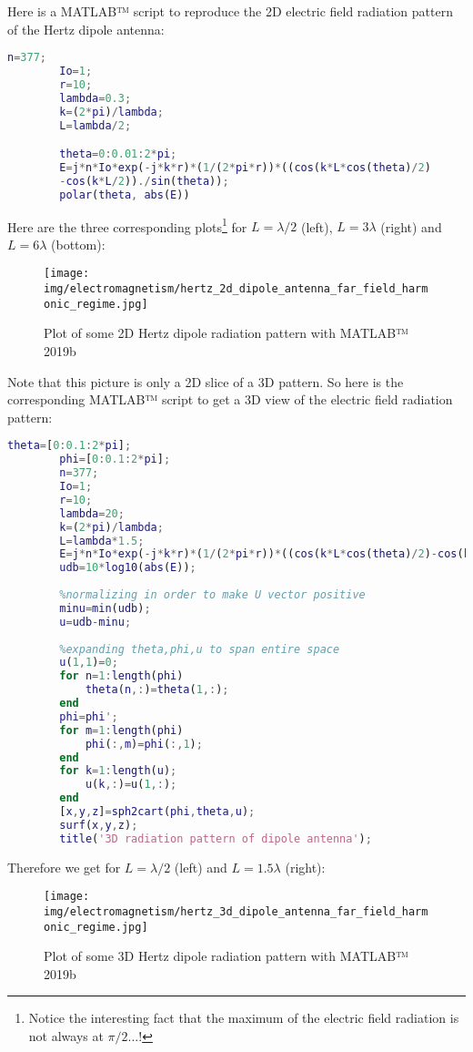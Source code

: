	Here is a MATLAB™ script to reproduce the 2D electric field radiation pattern of the Hertz dipole antenna:
	\begin{lstlisting}[language=MATLAB, caption={MATLAB code for 2D Hertz dipole antenna}]
		n=377;
		Io=1;
		r=10;
		lambda=0.3;
		k=(2*pi)/lambda;
		L=lambda/2;

		theta=0:0.01:2*pi;
		E=j*n*Io*exp(-j*k*r)*(1/(2*pi*r))*((cos(k*L*cos(theta)/2)
		-cos(k*L/2))./sin(theta));
		polar(theta, abs(E))
	\end{lstlisting}
	Here are the three corresponding plots\footnote{Notice the interesting fact that the maximum of the electric field radiation is not always at $\pi/2$...!} for $L=\lambda/2$ (left), $L=3\lambda$ (right) and $L=6\lambda$ (bottom):
	\begin{figure}[H]
		\centering
		\texttt{[image: img/electromagnetism/hertz\_2d\_dipole\_antenna\_far\_field\_harmonic\_regime.jpg]}
		\caption[Plot of some 2D Hertz dipole radiation pattern]{Plot of some 2D Hertz dipole radiation pattern with MATLAB™ 2019b}
	\end{figure}
	Note that this picture is only a 2D slice of a 3D pattern. So here is the corresponding MATLAB™ script to get a 3D view of the electric field radiation pattern:
	\begin{lstlisting}[language=MATLAB, caption={MATLAB code for 3D Hertz dipole antenna}]
		theta=[0:0.1:2*pi];
		phi=[0:0.1:2*pi];
		n=377;
		Io=1;
		r=10;
		lambda=20;
		k=(2*pi)/lambda;
		L=lambda*1.5;
		E=j*n*Io*exp(-j*k*r)*(1/(2*pi*r))*((cos(k*L*cos(theta)/2)-cos(k*L/2))./sin(theta));
		udb=10*log10(abs(E));
		
		%normalizing in order to make U vector positive
		minu=min(udb);
		u=udb-minu;
		
		%expanding theta,phi,u to span entire space
		u(1,1)=0;
		for n=1:length(phi)
		    theta(n,:)=theta(1,:);
		end
		phi=phi';
		for m=1:length(phi)
		    phi(:,m)=phi(:,1);
		end
		for k=1:length(u);
		    u(k,:)=u(1,:);
		end
		[x,y,z]=sph2cart(phi,theta,u);
		surf(x,y,z);
		title('3D radiation pattern of dipole antenna');
	\end{lstlisting}
	Therefore we get for $L=\lambda/2$ (left) and $L=1.5\lambda$ (right):
	\begin{figure}[H]
		\centering
		\texttt{[image: img/electromagnetism/hertz\_3d\_dipole\_antenna\_far\_field\_harmonic\_regime.jpg]}
		\caption[Plot of some 3D Hertz dipole radiation pattern]{Plot of some 3D Hertz dipole radiation pattern with MATLAB™ 2019b}
	\end{figure}
	
